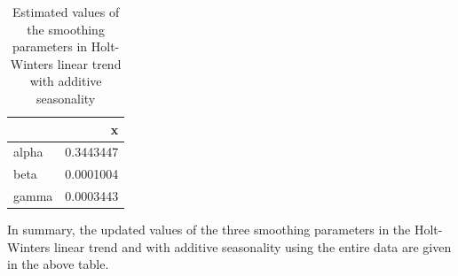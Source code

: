 \documentclass[
]{book}
\begin{document}
\begin{table}

\caption{\label{tab:unnamed-chunk-240}Estimated values of the smoothing parameters in
      Holt-Winters linear trend with additive seasonality}
\centering
\begin{tabular}[t]{l|r}
\hline
  & x\\
\hline
alpha & 0.3443447\\
\hline
beta & 0.0001004\\
\hline
gamma & 0.0003443\\
\hline
\end{tabular}
\end{table}

In summary, the updated values of the three smoothing parameters in the Holt-Winters linear trend and with additive seasonality using the entire data are given in the above table.

\hfill\break

\hfill\break

  
\end{document}
